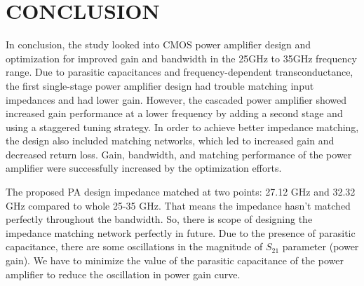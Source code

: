 \chapter{CONCLUSION}
In conclusion, the study looked into CMOS power amplifier design and optimization for improved gain and bandwidth in the  25GHz to 35GHz frequency range. Due to parasitic capacitances and frequency-dependent transconductance, the first single-stage power amplifier design had trouble matching input impedances and had lower gain. However, the cascaded power amplifier showed increased gain performance at a lower frequency by adding a second stage and using a staggered tuning strategy. In order to achieve better impedance matching, the design also included matching networks, which led to increased gain and decreased return loss. Gain, bandwidth, and matching performance of the power amplifier were successfully increased by the optimization efforts.

The proposed PA design impedance matched at two points: 27.12 GHz and 32.32 GHz compared to whole 25-35 GHz. That means the impedance hasn’t matched perfectly throughout the bandwidth. So, there is scope of designing the impedance matching network perfectly in future. Due to the presence of parasitic capacitance, there are some oscillations in the magnitude of $S_{21}$ parameter (power gain). We have to minimize the value of the parasitic capacitance of the power amplifier to reduce the oscillation in power gain curve.
